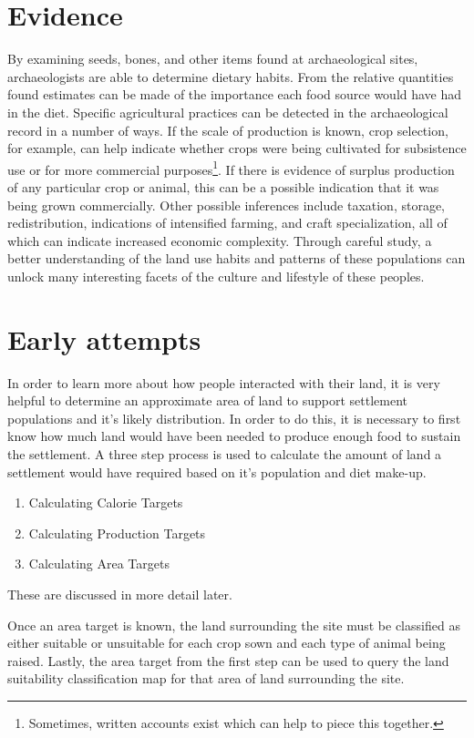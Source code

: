 \section{Evidence} \label{sec:Evidence} By examining seeds, bones, and other
items found at archaeological sites, archaeologists are able to determine 
dietary habits. From the relative quantities found estimates can be made of the
importance each food source would have had in the diet.  Specific agricultural practices
can be detected in the archaeological record in a number of ways.  If the scale
of production is known, crop selection, for example, can help indicate whether
crops were being cultivated for subsistence use or for more commercial
purposes\footnote{Sometimes, written accounts exist which can help to
piece this together.}.  If there is evidence of surplus production of any
particular crop or animal, this can be a possible indication that it was being
grown commercially.  Other possible inferences include taxation, storage,
redistribution, indications of intensified farming, and craft specialization,
all of which can indicate increased economic complexity.  Through careful
study, a better understanding of the land use habits and patterns of these
populations can unlock many interesting facets of the culture and lifestyle of
these peoples.

\section{Early attempts} \label{sec:EarlyAttempts} 

In order to learn more about how people interacted with their land, it is very
helpful to determine an approximate area of land to support settlement
populations and it's likely distribution.  In order to do this, it is necessary
to first know how much land would have been needed to produce enough food to
sustain the settlement.  A three step process is used to calculate the amount of
land a settlement would have required based on it's population and diet
make-up.  

\begin{enumerate}
 \item Calculating Calorie Targets
 \item Calculating Production Targets
 \item Calculating Area Targets
\end{enumerate}
These are discussed in more detail later.


Once an area target is known, the land surrounding the
site must be classified as either suitable or unsuitable for each crop sown and
each type of animal being raised.  Lastly, the area target from the first step
can be used to query the land suitability classification map for that area of
land surrounding the site.

